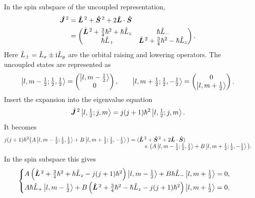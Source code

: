 In the spin subspace of the uncoupled representation,
\begin{equation}\begin{aligned}
\hat{\bm{J}}^{\,2}&=\hat{\bm{L}}^{\,2}+\hat{\bm{S}}^{\,2}
+2\hat{\bm{L}}\cdot\hat{\bm{S}}\\
&=\begin{pmatrix}
\hat{\bm{L}}^{\,2}+\frac34\hbar^2+\hbar\hat{L}_z&\hbar\hat{L}_-\\
\hbar\hat{L}_+&\hat{\bm{L}}^{\,2}+\frac34\hbar^2-\hbar\hat{L}_z
\end{pmatrix}.
\end{aligned}\end{equation}
Here $\hat{L}_\pm=\hat{L}_x\pm\mathrm{i}\hat{L}_y$ are the orbital raising and lowering operators. The uncoupled states are represented as
\begin{equation}
\left|l,m-\tfrac12;\tfrac12,\tfrac12\right\rangle
=\begin{pmatrix}\left|l,m-\tfrac12\right\rangle\\0\end{pmatrix},\qquad
\left|l,m+\tfrac12;\tfrac12,-\tfrac12\right\rangle
=\begin{pmatrix}0\\\left|l,m+\tfrac12\right\rangle\end{pmatrix}.
\end{equation}
Insert the expansion into the eigenvalue equation
\begin{equation}
\hat{\bm{J}}^{\,2}\left|l,\tfrac12;j,m\right\rangle
=j(j+1)\hbar^2\left|l,\tfrac12;j,m\right\rangle.
\end{equation}
It becomes
\begingroup\small
\begin{equation}\begin{aligned}
j(j+1)\hbar^2\big(A\left|l,m-\tfrac12;\tfrac12,\tfrac12\right\rangle
+B\left|l,m+\tfrac12;\tfrac12,-\tfrac12\right\rangle\big)
={}&(\hat{\bm{L}}^{\,2}+\hat{\bm{S}}^{\,2}+2\hat{\bm{L}}\cdot\hat{\bm{S}})\\[-1ex]
&\quad\times\big(A\left|l,m-\tfrac12;\tfrac12,\tfrac12\right\rangle
+B\left|l,m+\tfrac12;\tfrac12,-\tfrac12\right\rangle\big).
\end{aligned}\end{equation}
\endgroup
In the spin subspace this gives
\begin{equation}
\begin{cases}
A\left(\hat{\bm{L}}^{\,2}+\frac34\hbar^2+\hbar\hat{L}_z-j(j+1)\hbar^2\right)\left|l,m-\tfrac12\right\rangle
+B\hbar\hat{L}_-\left|l,m+\tfrac12\right\rangle=0,\\[1ex]
A\hbar\hat{L}_+\left|l,m-\tfrac12\right\rangle
+B\left(\hat{\bm{L}}^{\,2}+\frac34\hbar^2-\hbar\hat{L}_z-j(j+1)\hbar^2\right)\left|l,m+\tfrac12\right\rangle=0.
\end{cases}
\end{equation}
